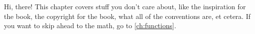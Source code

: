\label{intro}
\label{ch:intro}
\label{ch:introduction}

Hi, there! This chapter covers stuff you don't care about, like the inspiration
for the book, the copyright for the book, what all of the conventions are, et
cetera. If you want to skip ahead to the math, go to \cref{ch:functions}.






